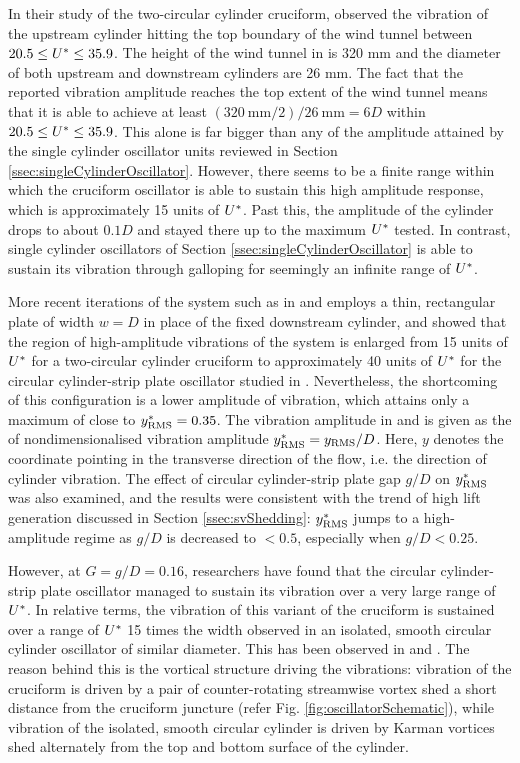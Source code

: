 \documentclass[oneside]{utmthesis}
\begin{document}
In their study of the two-circular cylinder cruciform, \citet{Shirakashi2001} observed the vibration of the upstream cylinder hitting the top boundary of the wind tunnel between $20.5 \leq U^{*} \leq 35.9$. The height of the wind tunnel in \citet{Shirakashi2001} is 320 mm and the diameter of both upstream and downstream cylinders are 26 mm. The fact that the reported vibration amplitude reaches the top extent of the wind tunnel means that it is able to achieve at least $(\SI{320}{\milli\metre}/2)/\SI{26}{\milli\metre} = 6D$ within $20.5 \leq U^{*} \leq 35.9$. This alone is far bigger than any of the amplitude attained by the single cylinder oscillator units reviewed in Section \ref{ssec:singleCylinderOscillator}. However, there seems to be a finite range within which the cruciform oscillator is able to sustain this high amplitude response, which is approximately 15 units of $U^{*}$. Past this, the amplitude of the cylinder drops to about $0.1D$ and stayed there up to the maximum $U^{*}$ tested. In contrast, single cylinder oscillators of Section \ref{ssec:singleCylinderOscillator} is able to sustain its vibration through galloping for seemingly an infinite range of $U^{*}$.

More recent iterations of the system such as in \citet{Koide2007} and \citet{Kato2007} employs a thin, rectangular plate of width $w = D$ in place of the fixed downstream cylinder, and showed that the region of high-amplitude vibrations of the system is enlarged from 15 units of $U^{*}$ for a two-circular cylinder cruciform to approximately 40 units of $U^{*}$ for the circular cylinder-strip plate oscillator studied in \citet{Koide2007}. Nevertheless, the shortcoming of this configuration is a lower amplitude of vibration, which attains only a maximum of close to $y^{*}_{\text{RMS}} = 0.35$. The vibration amplitude in \citet{Koide2007} and \citet{Kato2007} is given as the \rms{} of nondimensionalised vibration amplitude $y^{*}_{\text{RMS}} = y_{\text{RMS}}/D$. Here, $y$ denotes the coordinate pointing in the transverse direction of the flow, i.e. the direction of cylinder vibration. The effect of circular cylinder-strip plate gap $g/D$ on $y^{*}_{\text{RMS}}$ was also examined, and the results were consistent with the trend of high lift generation discussed in Section \ref{ssec:svShedding}: $y^{*}_{\text{RMS}}$ jumps to a high-amplitude regime as $g/D$ is decreased to $< 0.5$, especially when $g/D < 0.25$.

However, at $G = g/D = 0.16$, researchers have found that the circular cylinder-strip plate oscillator managed to sustain its vibration over a very large range of $U^{*}$. In relative terms, the vibration of this variant of the cruciform is sustained over a range of $U^{*}$ 15 times the width observed in an isolated, smooth circular cylinder oscillator of similar diameter. This has been observed in \citet{Koide2009} and \citet{Koide2013}. The reason behind this is the vortical structure driving the vibrations: vibration of the cruciform is driven by a pair of counter-rotating streamwise vortex shed a short distance from the cruciform juncture (refer Fig. \ref{fig:oscillatorSchematic}), while vibration of the isolated, smooth circular cylinder is driven by Karman vortices shed alternately from the top and bottom surface of the cylinder.
\end{document}
